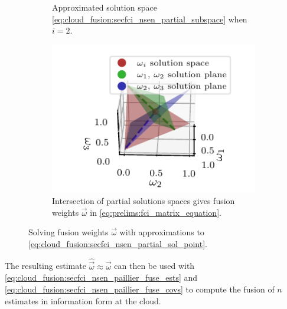 \begin{figure}[htbp]
\begin{subfigure}[htbp]{\textwidth}
\begin{center}
        \end{center}
        \caption{Approximated solution space \eqref{eq:cloud_fusion:secfci_nsen_partial_subspace} when $i=2$.}
        \label{fig:3_sensor_partial_sols}
    \end{subfigure}
    \hfill
    \begin{subfigure}[htbp]{\textwidth}
        \begin{center}
            \includegraphics{figures/partial_sol_planes.pdf}
        \end{center}
        \caption{Intersection of partial solutions spaces gives fusion weights $\vec{\omega}$ in \eqref{eq:prelims:fci_matrix_equation}.}
        \label{fig:3sen_planes}
    \end{subfigure}
    \caption{Solving fusion weights $\vec{\omega}$ with approximations to \eqref{eq:cloud_fusion:secfci_nsen_partial_sol_point}.}
    \label{fig:cloud_fusion:secfci_nsen_partial_sols_and_intersect}
\end{figure}

The resulting estimate $\hat{\vec{\omega}} \approx \vec{\omega}$ can then be used with \eqref{eq:cloud_fusion:secfci_nsen_paillier_fuse_ests} and \eqref{eq:cloud_fusion:secfci_nsen_paillier_fuse_covs} to compute the fusion of $n$ estimates in information form at the cloud.

% 
% 

